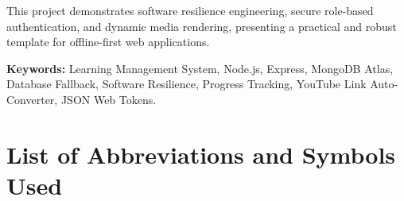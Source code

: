 \documentclass[12pt,a4paper]{report}
\begin{document}
This project demonstrates software resilience engineering, secure role-based authentication, and dynamic media rendering, presenting a practical and robust template for offline-first web applications.

\textbf{Keywords:} Learning Management System, Node.js, Express, MongoDB Atlas, Database Fallback, Software Resilience, Progress Tracking, YouTube Link Auto-Converter, JSON Web Tokens.

\clearpage

\tableofcontents
\clearpage

\listoffigures
{}
\clearpage

\listoftables
{}
\clearpage

\chapter*{List of Abbreviations and Symbols Used}
\end{document}
